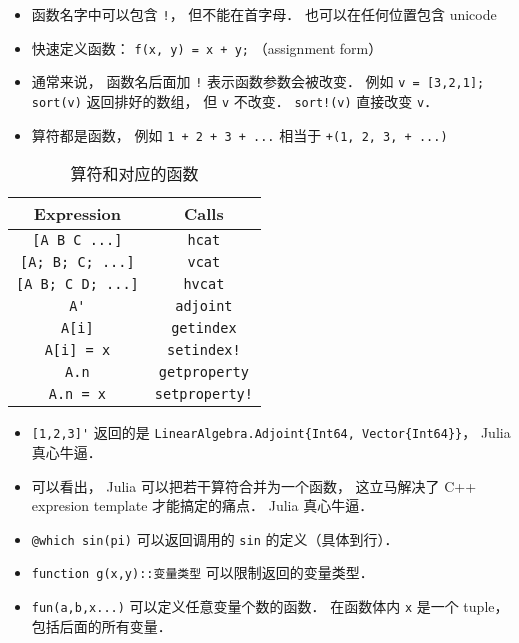 
\begin{issues}
\issueDraft
\end{issues}

\begin{itemize}
\item 函数名字中可以包含 \verb|!|， 但不能在首字母． 也可以在任何位置包含 unicode
\item 快速定义函数： \verb|f(x, y) = x + y;| （assignment form）
\item 通常来说， 函数名后面加 \verb|!| 表示函数参数会被改变． 例如 \verb|v = [3,2,1]; sort(v)| 返回排好的数组， 但 \verb|v| 不改变． \verb|sort!(v)| 直接改变 \verb|v|．
\item 算符都是函数， 例如 \verb|1 + 2 + 3 + ...| 相当于 \verb|+(1, 2, 3, + ...)|
\end{itemize}


\begin{table}[ht]
\centering
\caption{算符和对应的函数}\label{JuFunc_tab1}
\begin{tabular}{|c|c|}
\hline
Expression & Calls \\
\hline
\verb|[A B C ...]| & \verb|hcat| \\
\hline
\verb|[A; B; C; ...]| & \verb|vcat| \\
\hline
\verb|[A B; C D; ...]| & \verb|hvcat| \\
\hline
\verb|A'| & \verb|adjoint| \\
\hline
\verb|A[i]| & \verb|getindex| \\
\hline
\verb|A[i] = x| & \verb|setindex!| \\
\hline
\verb|A.n| & \verb|getproperty| \\
\hline
\verb|A.n = x| & \verb|setproperty!| \\
\hline
\end{tabular}
\end{table}

\begin{itemize}
\item \verb|[1,2,3]'| 返回的是 \verb|LinearAlgebra.Adjoint{Int64, Vector{Int64}}|， Julia 真心牛逼．
\item 可以看出， Julia 可以把若干算符合并为一个函数， 这立马解决了 C++ expresion template 才能搞定的痛点． Julia 真心牛逼．
\item \verb|@which sin(pi)| 可以返回调用的 \verb|sin| 的定义（具体到行）．
\item \verb|function g(x,y)::变量类型| 可以限制返回的变量类型．
\item \verb|fun(a,b,x...)| 可以定义任意变量个数的函数． 在函数体内 \verb|x| 是一个 tuple， 包括后面的所有变量．
\end{itemize}

